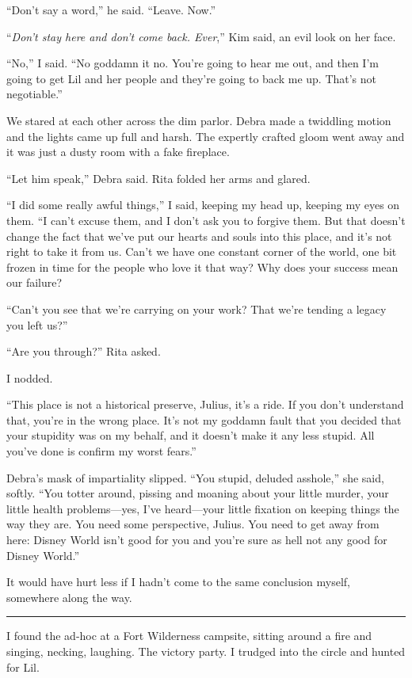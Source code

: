 “Don't say a word,” he said. “Leave. Now.”

“\emph{Don't stay here and don't come back. Ever},” Kim said, an
evil look on her face.

“No,” I said. “No goddamn it no. You're going to hear me out, and
then I'm going to get Lil and her people and they're going to back
me up. That's not negotiable.”

We stared at each other across the dim parlor. Debra made a
twiddling motion and the lights came up full and harsh. The
expertly crafted gloom went away and it was just a dusty room with
a fake fireplace.

“Let him speak,” Debra said. Rita folded her arms and glared.

“I did some really awful things,” I said, keeping my head up,
keeping my eyes on them. “I can't excuse them, and I don't ask you
to forgive them. But that doesn't change the fact that we've put
our hearts and souls into this place, and it's not right to take it
from us. Can't we have one constant corner of the world, one bit
frozen in time for the people who love it that way? Why does your
success mean our failure?

“Can't you see that we're carrying on your work? That we're tending
a legacy you left us?”

“Are you through?” Rita asked.

I nodded.

“This place is not a historical preserve, Julius, it's a ride. If
you don't understand that, you're in the wrong place. It's not my
goddamn fault that you decided that your stupidity was on my
behalf, and it doesn't make it any less stupid. All you've done is
confirm my worst fears.”

Debra's mask of impartiality slipped. “You stupid, deluded
asshole,” she said, softly. “You totter around, pissing and moaning
about your little murder, your little health problems—yes, I've
heard—your little fixation on keeping things the way they are. You
need some perspective, Julius. You need to get away from here:
Disney World isn't good for you and you're sure as hell not any
good for Disney World.”

It would have hurt less if I hadn't come to the same conclusion
myself, somewhere along the way.

\begin{center}\rule{3in}{0.4pt}\end{center}

I found the ad-hoc at a Fort Wilderness campsite, sitting around a
fire and singing, necking, laughing. The victory party. I trudged
into the circle and hunted for Lil.

